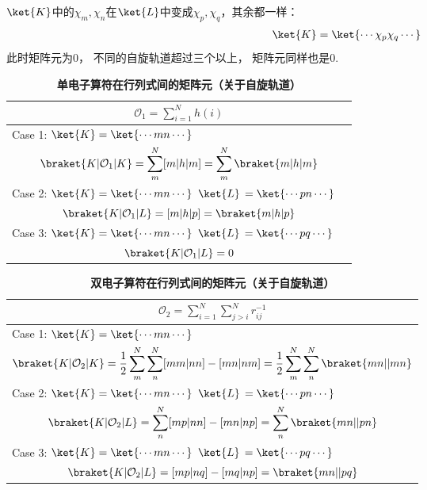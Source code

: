$\ket{K}$中的$\chi_m,\chi_n$在$\ket{L}$中变成$\chi_p,\chi_q$，其余都一样：
\begin{align}
\ket{K}=\ket{\cdots\chi_p\chi_q\cdots}
\end{align}
此时矩阵元为0，
不同的自旋轨道超过三个以上，
矩阵元同样也是0.


\begin{table}[ht]
	\renewcommand\arraystretch{1.7}
	\centering
	\caption{\bf 单电子算符在行列式间的矩阵元（关于自旋轨道）}
	\label{t2.3}
	\begin{tabularx}{\textwidth}{lY}
		\hline
		 \\\hline
		Case 1: $\ket{K}=\ket{\cdots mn\cdots}$&\\
		\\
		Case 2: \parbox[t]{.5\textwidth}{
		$\ket{K}=\ket{\cdots mn\cdots}$\\
		$\ket{L}\,=\ket{\cdots pn\cdots}$
			}&	\\
		\\
		Case 3: \parbox[t]{5cm}{
			$\ket{K}=\ket{\cdots mn\cdots}$\\
			$\ket{L}\,=\ket{\cdots pq\cdots}$}& \\
		\\\hline
		
	\end{tabularx}
\end{table}

\begin{table}[ht]
	\renewcommand\arraystretch{1.7}
	\centering
	\caption{\bf 双电子算符在行列式间的矩阵元（关于自旋轨道）}
	\label{t2.4}
	\begin{tabularx}{\textwidth}{lY}
		\hline
		\\\hline
		Case 1: $\ket{K}=\ket{\cdots mn\cdots}$&\\
		\\
		Case 2: \parbox[t]{5cm}{
			$\ket{K}=\ket{\cdots mn\cdots}$\\
			$\ket{L}\,=\ket{\cdots pn\cdots}$
		}	&\\
		\\
		Case 3: \parbox[t]{5cm}{
			$\ket{K}=\ket{\cdots mn\cdots}$\\
			$\ket{L}\,=\ket{\cdots pq\cdots}$}&\\
		\\\hline
	\end{tabularx}
\end{table}

